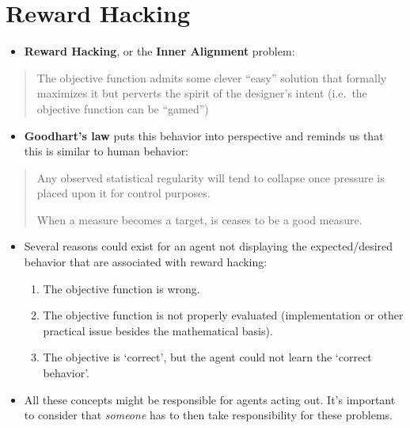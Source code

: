 \documentclass[
]{book}
\providecommand{\tightlist}{%
  \setlength{\itemsep}{0pt}\setlength{\parskip}{0pt}}
\begin{document}
\hypertarget{reward-hacking}{%
\section{Reward Hacking}\label{reward-hacking}}

\begin{itemize}
\tightlist
\item
  \textbf{Reward Hacking}, or the \textbf{Inner Alignment} problem:
\end{itemize}

\begin{quote}
The objective function admits some clever ``easy'' solution that
formally maximizes it but perverts the spirit of the designer's intent
(i.e.~the objective function can be ``gamed'')
\end{quote}

\begin{itemize}
\tightlist
\item
  \textbf{Goodhart's law} puts this behavior into perspective and
  reminds us that this is similar to human behavior:
\end{itemize}

\begin{quote}
Any observed statistical regularity will tend to collapse once pressure
is placed upon it for control purposes.

When a measure becomes a target, is ceases to be a good measure.
\end{quote}

\begin{itemize}
\item
  Several reasons could exist for an agent not displaying the
  expected/desired behavior that are associated with reward hacking:

  \begin{enumerate}
  \def\labelenumi{\arabic{enumi}.}
  \tightlist
  \item
    The objective function is wrong.
  \item
    The objective function is not properly evaluated (implementation or
    other practical issue besides the mathematical basis).
  \item
    The objective is `correct', but the agent could not learn the
    `correct behavior'.
  \end{enumerate}
\item
  All these concepts might be responsible for agents acting out. It's
  important to consider that \emph{someone} has to then take
  responsibility for these problems.
\end{itemize}
\end{document}
